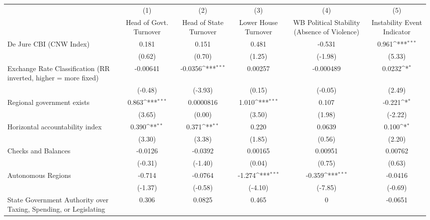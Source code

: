 {
\def\sym#1{\ifmmode^{#1}\else\(^{#1}\)\fi}
\begin{tabular}{l*{5}{c}}
\hline\hline
                &\multicolumn{1}{c}{(1)}&\multicolumn{1}{c}{(2)}&\multicolumn{1}{c}{(3)}&\multicolumn{1}{c}{(4)}&\multicolumn{1}{c}{(5)}\\
                &\multicolumn{1}{c}{Head of Govt. Turnover}&\multicolumn{1}{c}{Head of State Turnover}&\multicolumn{1}{c}{Lower House Turnover}&\multicolumn{1}{c}{WB Political Stability (Absence of Violence)}&\multicolumn{1}{c}{Instability Event Indicator}\\
\hline
De Jure CBI (CNW Index)&    0.181         &    0.151         &    0.481         &   -0.531         &    0.961\sym{***}\\
                &   (0.62)         &   (0.70)         &   (1.25)         &  (-1.98)         &   (5.33)         \\
[1em]
Exchange Rate Classification (RR inverted, higher = more fixed)& -0.00641         &  -0.0356\sym{***}&  0.00257         &-0.000489         &   0.0232\sym{*}  \\
                &  (-0.48)         &  (-3.93)         &   (0.15)         &  (-0.05)         &   (2.49)         \\
[1em]
Regional government exists   &    0.863\sym{***}&0.0000816         &    1.010\sym{***}&    0.107         &   -0.221\sym{*}  \\
                &   (3.65)         &   (0.00)         &   (3.50)         &   (1.98)         &  (-2.22)         \\
[1em]
Horizontal accountability index&    0.390\sym{**} &    0.371\sym{**} &    0.220         &   0.0639         &    0.100\sym{*}  \\
                &   (3.30)         &   (3.38)         &   (1.85)         &   (0.56)         &   (2.20)         \\
[1em]
Checks and Balances&  -0.0126         &  -0.0392         &  0.00165         &  0.00951         &  0.00762         \\
                &  (-0.31)         &  (-1.40)         &   (0.04)         &   (0.75)         &   (0.63)         \\
[1em]
Autonomous Regions&   -0.714         &  -0.0764         &   -1.274\sym{***}&   -0.359\sym{***}&  -0.0416         \\
                &  (-1.37)         &  (-0.58)         &  (-4.10)         &  (-7.85)         &  (-0.69)         \\
[1em]
State Government Authority over Taxing, Spending, or Legislating&    0.306         &   0.0825         &    0.465         &        0         &  -0.0651         \\

\end{tabular}}
